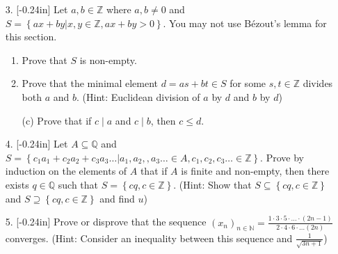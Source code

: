 \documentclass[letterpaper,12pt]{article}
\newcommand{\set}[1]{\left\{ #1 \right\}}
\theoremstyle{definition}
\begin{document}
\pagebreak
\begin{enumerate}
    \item[3. ]\reversemarginpar{}[-0.24in] Let $a,b \in \mathbb{Z}$ where $a,b \neq 0$ and $S = \set{ax + by | x,y \in \mathbb{Z}, ax + by > 0}$. You may not use Bézout's lemma for this section. \begin{enumerate}
        \item Prove that $S$ is non-empty. 
            \vspace{1.1in}
        \item Prove that the minimal element $d = as + bt \in S$ for some $s,t \in \mathbb{Z}$ divides both $a$ and $b$. (Hint: Euclidean division of $a$ by $d$ and $b$ by $d$)
    \end{enumerate}
\end{enumerate}
\pagebreak
\begin{enumerate}
    \item[] \begin{enumerate}
        \item[(c)] Prove that if $c \mid a$ and $c \mid b$, then $c \leq d$.
    \end{enumerate}
\end{enumerate}
\pagebreak
\begin{enumerate}
    \item[4.]\reversemarginpar{}[-0.24in] 
  Let $A\subseteq \mathbb{Q}$ and $S = \set{c_1a_1 + c_2a_2 + c_3a_3 \ldots | a_1,a_2,,a_3\ldots \in A, c_1,c_2,c_3 \ldots \in \mathbb{Z}}$. Prove by induction on the elements of $A$ that if $A$ is finite and non-empty, then there exists $q \in \mathbb{Q}$ such that $S = \set{cq, c \in \mathbb{Z}}$. (Hint: Show that $S \subseteq \set{cq, c \in \mathbb{Z}}$ and $S \supseteq \set{cq, c \in \mathbb{Z}}$ and find $u$)
\end{enumerate}
\pagebreak
\begin{enumerate}
    \item[5.] \reversemarginpar{}[-0.24in] Prove or disprove that the sequence $(x_n)_{n \in \mathbb{N}} = \frac{1\cdot 3 \cdot 5 \cdot \ldots \cdot (2n-1)}{2 \cdot 4 \cdot 6 \cdot \ldots (2n)}$ converges. (Hint: Consider an inequality between this sequence and $\frac{1}{\sqrt{3n+1}}$)
\end{enumerate}
\end{document}
